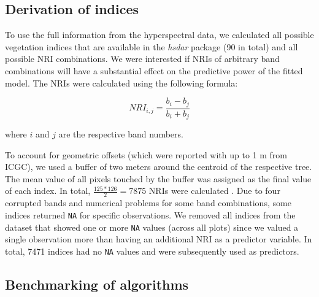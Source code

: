 \documentclass[review]{elsarticle}
\begin{document}
\subsection{Derivation of indices}

\noindent To use the full information from the hyperspectral data, we calculated all possible vegetation indices that are available in the \textit{hsdar} package (90 in total) and all possible \ac{NRI} combinations.
We were interested if NRIs of arbitrary band combinations will have a substantial effect on the predictive power of the fitted model.
The NRIs were calculated using the following formula:

\begin{equation}
	NRI_{i,j} = \frac{b_{i} - b_{j}}{b_{i} + b_{j}}
\end{equation}

\noindent
where $i$ and $j$ are the respective band numbers.

\bigbreak

\noindent To account for geometric offsets (which were reported with up to 1 m from \ac{ICGC}), we used a buffer of two meters around the centroid of the respective tree.
The mean value of all pixels touched by the buffer was assigned as the final value of each index.
In total, $\frac{125*126}{2} = 7875$ NRIs were calculated .
Due to four corrupted bands and numerical problems for some band combinations, some indices returned \texttt{NA} for specific observations.
We removed all indices from the dataset that showed one or more \texttt{NA} values (across all plots) since we valued a single observation more than having an additional NRI as a predictor variable.
In total, 7471 indices had no \texttt{NA} values and were subsequently used as predictors.

\subsection{Benchmarking of algorithms}
\end{document}
